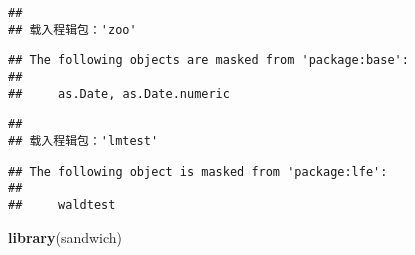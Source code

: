 \documentclass[
]{article}
\newenvironment{Shaded}{\begin{snugshade}}{\end{snugshade}}
\newcommand{\AttributeTok}[1]{\textcolor[rgb]{0.13,0.29,0.53}{#1}}
\newcommand{\CommentTok}[1]{\textcolor[rgb]{0.56,0.35,0.01}{\textit{#1}}}
\newcommand{\ConstantTok}[1]{\textcolor[rgb]{0.56,0.35,0.01}{#1}}
\newcommand{\FunctionTok}[1]{\textcolor[rgb]{0.13,0.29,0.53}{\textbf{#1}}}
\newcommand{\NormalTok}[1]{#1}
\newcommand{\OtherTok}[1]{\textcolor[rgb]{0.56,0.35,0.01}{#1}}
\newcommand{\SpecialCharTok}[1]{\textcolor[rgb]{0.81,0.36,0.00}{\textbf{#1}}}
\newcommand{\StringTok}[1]{\textcolor[rgb]{0.31,0.60,0.02}{#1}}
\begin{document}
\begin{verbatim}
## 
## 载入程辑包：'zoo'
\end{verbatim}

\begin{verbatim}
## The following objects are masked from 'package:base':
## 
##     as.Date, as.Date.numeric
\end{verbatim}

\begin{verbatim}
## 
## 载入程辑包：'lmtest'
\end{verbatim}

\begin{verbatim}
## The following object is masked from 'package:lfe':
## 
##     waldtest
\end{verbatim}

\begin{Shaded}
\begin{Highlighting}[]
\FunctionTok{library}\NormalTok{(sandwich)}
\end{Highlighting}
\end{Shaded}

\begin{Shaded}
\end{Shaded}
\end{document}
